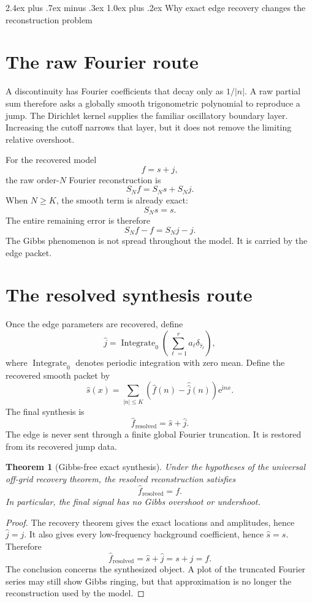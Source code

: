 \documentclass[11pt,oneside]{book}
\makeatletter
\renewcommand\chapter{\@startsection{chapter}{0}{\z@}%
  {2.4ex plus .7ex minus .3ex}%
  {1.0ex plus .2ex}%
  {\normalfont\LARGE\bfseries\color{Ink}}}
\newtheorem{theorem}{Theorem}[chapter]
\theoremstyle{remark}
\newcommand{\e}{\mathrm e}
\newcommand{\ii}{\mathrm i}
\makeatother
\begin{document}
\chapter{Why exact edge recovery changes the reconstruction problem}
\section{The raw Fourier route}
A discontinuity has Fourier coefficients that decay only as \(1/|n|\). A raw partial sum therefore asks a globally smooth trigonometric polynomial to reproduce a jump. The Dirichlet kernel supplies the familiar oscillatory boundary layer. Increasing the cutoff narrows that layer, but it does not remove the limiting relative overshoot.

For the recovered model
\[
f=s+j,
\]
the raw order-\(N\) Fourier reconstruction is
\[
S_Nf=S_Ns+S_Nj.
\]
When \(N\ge K\), the smooth term is already exact:
\[
S_Ns=s.
\]
The entire remaining error is therefore
\[
S_Nf-f=S_Nj-j.
\]
The Gibbs phenomenon is not spread throughout the model. It is carried by the edge packet.

\section{The resolved synthesis route}
Once the edge parameters are recovered, define
\[
\widehat j=\operatorname{Integrate}_{0}\left(
\sum_{\ell=1}^{r}\widehat a_\ell\delta_{\widehat\tau_\ell}
\right),
\]
where \(\operatorname{Integrate}_{0}\) denotes periodic integration with zero mean. Define the recovered smooth packet by
\[
\widehat s(x)
=
\sum_{|n|\le K}
\left(
\widehat f(n)-\widehat{\widehat j}(n)
\right)
\e^{\ii nx}.
\]
The final synthesis is
\[
\boxed{
\widehat f_{\mathrm{resolved}}
=
\widehat s+\widehat j.
}
\]
The edge is never sent through a finite global Fourier truncation. It is restored from its recovered jump data.

\begin{theorem}[Gibbs-free exact synthesis]
Under the hypotheses of the universal off-grid recovery theorem, the resolved reconstruction satisfies
\[
\widehat f_{\mathrm{resolved}}=f.
\]
In particular, the final signal has no Gibbs overshoot or undershoot.
\end{theorem}

\begin{proof}
The recovery theorem gives the exact locations and amplitudes, hence \(\widehat j=j\). It also gives every low-frequency background coefficient, hence \(\widehat s=s\). Therefore
\[
\widehat f_{\mathrm{resolved}}
=\widehat s+\widehat j
=s+j=f.
\]
The conclusion concerns the synthesized object. A plot of the truncated Fourier series may still show Gibbs ringing, but that approximation is no longer the reconstruction used by the model.
\end{proof}
\end{document}
